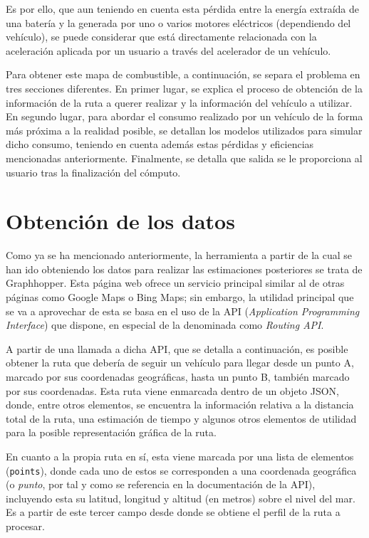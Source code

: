 \documentclass[11pt,spanish,listoffigures,listoftables]{tfgetsinf}
\begin{document}
Es por ello, que aun teniendo en cuenta esta pérdida entre la energía extraída de una batería y la generada por uno o varios motores eléctricos (dependiendo del vehículo), se puede considerar que está directamente relacionada con la aceleración aplicada por un usuario a través del acelerador de un vehículo.

Para obtener este mapa de combustible, a continuación, se separa el problema en tres secciones diferentes. En primer lugar, se explica el proceso de obtención de la información de la ruta a querer realizar y la información del vehículo a utilizar. En segundo lugar, para abordar el consumo realizado por un vehículo de la forma más próxima a la realidad posible, se detallan los modelos utilizados para simular dicho consumo, teniendo en cuenta además estas pérdidas y eficiencias mencionadas anteriormente. Finalmente, se detalla que salida se le proporciona al usuario tras la finalización del cómputo.

\section{Obtención de los datos}
\label{obtencion_de_datos}
Como ya se ha mencionado anteriormente, la herramienta a partir de la cual se han ido obteniendo los datos para realizar las estimaciones posteriores se trata de Graphhopper. Esta página web ofrece un servicio principal similar al de otras páginas como Google Maps o Bing Maps; sin embargo, la utilidad principal que se va a aprovechar de esta se basa en el uso de la API (\textit{Application Programming Interface}) que dispone, en especial de la denominada como \textit{Routing API}.

A partir de una llamada a dicha API, que se detalla a continuación, es posible obtener la ruta que debería de seguir un vehículo para llegar desde un punto A, marcado por sus coordenadas geográficas, hasta un punto B, también marcado por sus coordenadas. Esta ruta viene enmarcada dentro de un objeto JSON, donde, entre otros elementos, se encuentra la información relativa a la distancia total de la ruta, una estimación de tiempo y algunos otros elementos de utilidad para la posible representación gráfica de la ruta.

En cuanto a la propia ruta en sí, esta viene marcada por una lista de elementos (\verb|points|), donde cada uno de estos se corresponden a una coordenada geográfica (o \textit{punto}, por tal y como se referencia en la documentación de la API), incluyendo esta su latitud, longitud y altitud (en metros) sobre el nivel del mar. Es a partir de este tercer campo desde donde se obtiene el perfil de la ruta a procesar.
\end{document}

